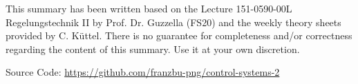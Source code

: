 



\maketitle
\begin{center}
    \parbox{0.5\linewidth}{\begin{center}
        This summary has been written based on the Lecture 151-0590-00L Regelungstechnik II by Prof. Dr. Guzzella (FS20) and the weekly theory sheets provided by C. Küttel. There is no guarantee for completeness and/or correctness regarding the content of this summary. Use it at your own discretion.
        
        Source Code: \url{https://github.com/franzbu-png/control-systems-2}
    \end{center}}
\end{center}
\newpage

\begin{center}
    \begin{multicols*}{3}
        \tableofcontents
    \end{multicols*}
\end{center}

